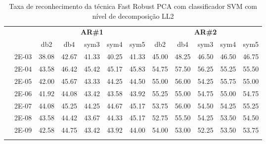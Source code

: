\begin{table}[H]
\begin{tabular}{|c|c|c c c c c|c c c c c|}
\\\midrule
\end{tabular}

\end{table}



\begin{table}[H]
	\centering
    \normalsize
	\caption{Taxa de reconhecimento da técnica Fast Robust PCA com classificador SVM com nível de decomposição LL2}
	\begin{tabular}{|c|c|c c c c c|c c c c c|}
\cline{3-12}
\multicolumn{2}{c|}{\multirow{2}{*}{}} & \multicolumn{5}{c|}{\textbf{AR\#1}}  & \multicolumn{5}{c|}{\textbf{AR\#2}} \\\cline{3-12}

\multicolumn{2}{c|}{}  & db2 & db4 & sym3 & sym4 & sym5 & db2 & db4& sym3 & sym4 & sym5 \\\hline
\multicolumn{1}{|c|}{ \multirow{6}{*}{\rotatebox[origin=c]{90}{\textbf{Gamma}}} }
&2E-03&	38.08&	42.67&	41.33&	40.25&	41.33&	45.00&	48.25&	46.50&	46.50&	46.75	\\\cline{2-12}
&2E-04&	43.58&	46.42&	45.42&	45.17&	45.83&	54.75&	57.50&	56.25&	55.25&	55.50	\\\cline{2-12}
&2E-05&	42.00&	45.67&	43.33&	44.25&	44.50&	55.00&	56.00&	54.25&	55.75&	55.00	\\\cline{2-12}
&2E-06&	41.92&	44.08&	43.42&	43.58&	43.92&	55.25&	55.00&	54.75&	55.00&	54.75	\\\cline{2-12}
&2E-07&	44.08&	45.25&	44.25&	44.67&	45.17&	53.75&	56.00&	54.50&	54.25&	55.25	\\\cline{2-12}
&2E-08&	43.58&	44.42&	43.67&	44.33&	45.17&	52.75&	55.50&	54.25&	53.50&	54.50	\\\cline{2-12}
&2E-09&	42.58&	44.75&	43.42&	43.92&	44.00&	54.00&	53.00&	52.25&	53.50&	53.75	



\\ \midrule
\multicolumn{12}{c}{}\\ 


\end{tabular}
\end{table}
